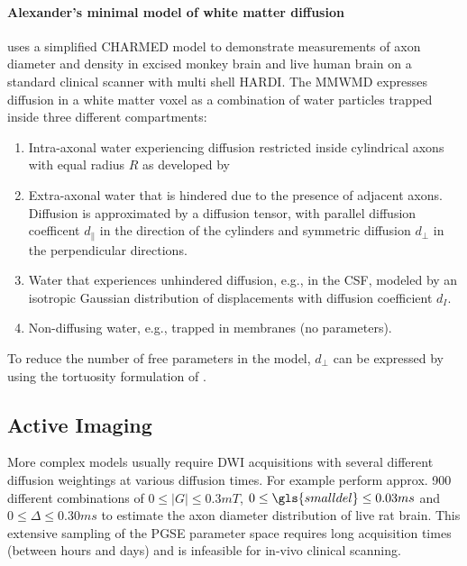 \paragraph*{Alexander's minimal model of white matter diffusion} 
\label{par:alexanders_model}
\citet{Alexander:2010} uses a simplified CHARMED model to demonstrate measurements of axon diameter and density in excised monkey brain and live human brain on a standard clinical scanner with multi shell \gls{HARDI}. The \gls{MMWMD} expresses diffusion in a white matter voxel as a combination of water particles trapped inside three different compartments: 
\begin{enumerate}
  \item Intra-axonal water experiencing diffusion restricted inside cylindrical axons with equal radius $R$ as developed by \citet{Gelderen:1994}
  \item Extra-axonal water that is hindered due to the presence of adjacent axons. Diffusion is approximated by a diffusion tensor, with parallel diffusion coefficent $d_\parallel$ in the direction of the cylinders and symmetric diffusion $d_\perp$ in the perpendicular directions.
  \item Water that experiences unhindered diffusion, e.g., in the {\gls{CSF}}, modeled by an isotropic Gaussian distribution of displacements with diffusion coefficient $d_{I}$.
  \item Non-diffusing water, e.g., trapped in membranes (no parameters).
\end{enumerate}
  
To reduce the number of free parameters in the model, $d_\perp$ can be expressed by using the tortuosity formulation of \citet{Szafer:1995}.

\subsection*{Active Imaging}
\label{sec:protocol_optimisation}
More complex models usually require  {\gls{DWI}}  acquisitions with several different diffusion weightings at various diffusion times. For example \citet{Barazany:2009} perform approx. 900 different combinations of $0\le|G|\le 0.3mT$, $0\le {\gls{smalldel}} \le 0.03ms$ and $0\le \Delta \le 0.30ms$ to estimate the axon diameter distribution of live rat brain. This extensive sampling of the \gls{PGSE} parameter space requires long acquisition times (between hours and days) and is infeasible for in-vivo clinical scanning. 

